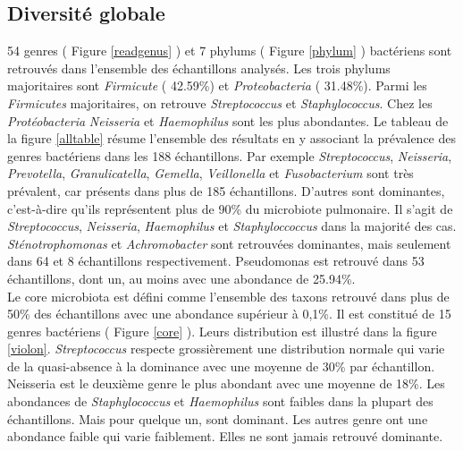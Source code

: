 \documentclass[12pt,a4paper]{article}
\begin{document}
\subsection{Diversité globale}
54 genres ( Figure \ref{readgenus} ) et 7 phylums ( Figure \ref{phylum} ) bactériens sont retrouvés dans l'ensemble des échantillons analysés. 
Les trois phylums majoritaires sont \textit{Firmicute} ( 42.59\%) et \textit{Proteobacteria} ( 31.48\%). Parmi les \textit{Firmicutes} majoritaires, on retrouve \textit{Streptococcus} et \textit{Staphylococcus}. Chez les \textit{Protéobacteria} \textit{Neisseria} et \textit{Haemophilus} sont les plus abondantes.
Le tableau de la figure \ref{alltable} résume l'ensemble des résultats en y associant la prévalence des genres bactériens dans les 188 échantillons.
Par exemple \textit{Streptococcus}, \textit{Neisseria}, \textit{Prevotella}, \textit{Granulicatella}, \textit{Gemella}, \textit{Veillonella} et \textit{Fusobacterium} sont très prévalent, car présents dans plus de 185 échantillons.
D’autres sont dominantes, c’est-à-dire qu’ils représentent plus de 90\% du microbiote pulmonaire. Il s’agit de \textit{Streptococcus}, \textit{Neisseria}, \textit{Haemophilus} et \textit{Staphyloccoccus} dans la majorité des cas. \textit{Sténotrophomonas} et \textit{Achromobacter} sont retrouvées dominantes, mais seulement dans 64 et 8 échantillons respectivement. Pseudomonas est retrouvé dans 53 échantillons, dont un, au moins avec une abondance de 25.94\%. \\
Le core microbiota est défini comme l'ensemble des taxons retrouvé dans plus de 50\% des échantillons avec une abondance supérieur à 0,1\%. Il est constitué de 15 genres bactériens ( Figure \ref{core} ). Leurs distribution est illustré dans la figure \ref{violon}.
\textit{Streptococcus} respecte grossièrement une distribution normale qui varie de la quasi-absence à la dominance avec une moyenne de 30\% par échantillon. Neisseria est le deuxième genre le plus abondant avec une moyenne de 18\%.
Les abondances de \textit{Staphylococcus} et \textit{Haemophilus} sont faibles dans la plupart des échantillons. Mais pour quelque un, sont dominant. Les autres genre ont une abondance faible qui varie faiblement. Elles ne sont jamais retrouvé dominante.
\end{document}
